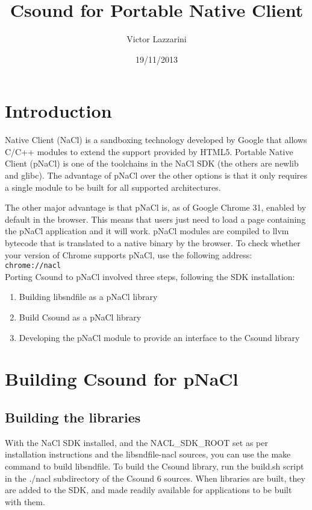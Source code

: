 \documentclass[11pt]{article}
\begin{document}
\title{Csound for Portable Native Client}
\author{Victor Lazzarini}
\date{19/11/2013}
\maketitle

\section{Introduction}

Native Client (NaCl) is a sandboxing technology developed by Google that allows C/C++ modules to extend the support provided
by HTML5. Portable Native Client (pNaCl) is one of the toolchains in the NaCl SDK (the others are newlib and glibc). The advantage
of pNaCl over the other options is that it only requires a single module to be built for all supported architectures.

The other major advantage is that pNaCl is, as of Google Chrome 31, enabled by default in the browser. This means that users
just need to load a page containing the pNaCl application and it will work. pNaCl modules are compiled to llvm bytecode that is 
translated to a native binary by the browser. To check whether your version of Chrome supports pNaCl, use the following address:
\\

 {\tt chrome://nacl }
\\

Porting Csound to pNaCl involved three steps, following the SDK installation:
\\
\begin{enumerate}
\item Building libsndfile as a pNaCl library
\item Build Csound as a pNaCl library
\item Developing the pNaCl module to provide an interface to the Csound library
\end{enumerate}


\section{Building Csound for pNaCl}

\subsection{Building the libraries}

With the NaCl SDK installed, and the NACL\_SDK\_ROOT set as per installation instructions and the libsndfile-nacl sources,
you can use the make command to build libsndfile. To build the Csound library, run  the build.sh script in the ./nacl subdirectory 
of the Csound 6 sources. When libraries are built, they are added to the SDK, and made readily available for applications to be
built with them.
\end{document}
